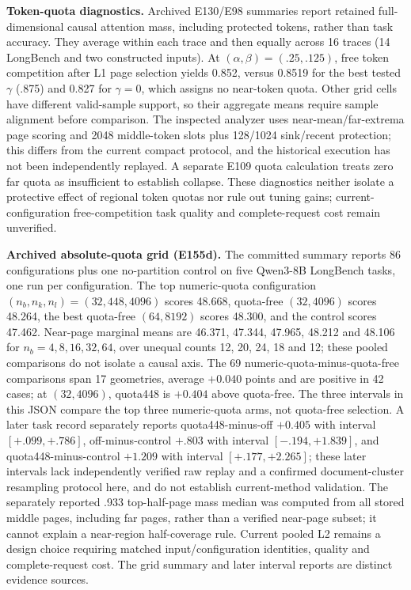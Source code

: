 \documentclass[10pt,letterpaper]{article}
\begin{document}
\textbf{Token-quota diagnostics.} Archived E130/E98 summaries report retained full-dimensional causal attention mass, including protected tokens, rather than task accuracy. They average within each trace and then equally across 16 traces (14 LongBench and two constructed inputs). At $(\alpha,\beta)=(.25,.125)$, free token competition after L1 page selection yields 0.852, versus 0.8519 for the best tested $\gamma$ (.875) and 0.827 for $\gamma=0$, which assigns no near-token quota. Other grid cells have different valid-sample support, so their aggregate means require sample alignment before comparison. The inspected analyzer uses near-mean/far-extrema page scoring and 2048 middle-token slots plus 128/1024 sink/recent protection; this differs from the current compact protocol, and the historical execution has not been independently replayed. A separate E109 quota calculation treats zero far quota as insufficient to establish collapse. These diagnostics neither isolate a protective effect of regional token quotas nor rule out tuning gains; current-configuration free-competition task quality and complete-request cost remain unverified.

\textbf{Archived absolute-quota grid (E155d).} The committed summary reports 86 configurations plus one no-partition control on five Qwen3-8B LongBench tasks, one run per configuration. The top numeric-quota configuration $(n_b,n_k,n_l)=(32,448,4096)$ scores 48.668, quota-free $(32,4096)$ scores 48.264, the best quota-free $(64,8192)$ scores 48.300, and the control scores 47.462. Near-page marginal means are 46.371, 47.344, 47.965, 48.212 and 48.106 for $n_b=4,8,16,32,64$, over unequal counts 12, 20, 24, 18 and 12; these pooled comparisons do not isolate a causal axis. The 69 numeric-quota-minus-quota-free comparisons span 17 geometries, average $+0.040$ points and are positive in 42 cases; at $(32,4096)$, quota448 is $+0.404$ above quota-free. The three intervals in this JSON compare the top three numeric-quota arms, not quota-free selection. A later task record separately reports quota448-minus-off $+0.405$ with interval $[+.099,+.786]$, off-minus-control $+.803$ with interval $[-.194,+1.839]$, and quota448-minus-control $+1.209$ with interval $[+.177,+2.265]$; these later intervals lack independently verified raw replay and a confirmed document-cluster resampling protocol here, and do not establish current-method validation. The separately reported .933 top-half-page mass median was computed from all stored middle pages, including far pages, rather than a verified near-page subset; it cannot explain a near-region half-coverage rule. Current pooled L2 remains a design choice requiring matched input/configuration identities, quality and complete-request cost. The grid summary and later interval reports are distinct evidence sources.
\end{document}
